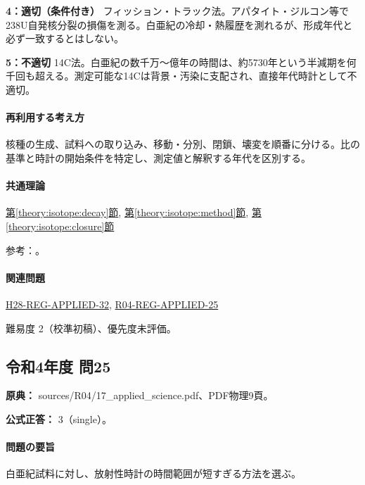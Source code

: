 \noindent\textbf{4：適切（条件付き）} フィッション・トラック法。アパタイト・ジルコン等で238U自発核分裂の損傷を測る。白亜紀の冷却・熱履歴を測れるが、形成年代と必ず一致するとはしない。\par

\noindent\textbf{5：不適切} 14C法。白亜紀の数千万〜億年の時間は、約5730年という半減期を何千回も超える。測定可能な14Cは背景・汚染に支配され、直接年代時計として不適切。\par

\paragraph{再利用する考え方} 核種の生成、試料への取り込み、移動・分別、閉鎖、壊変を順番に分ける。比の基準と時計の開始条件を特定し、測定値と解釈する年代を区別する。

\paragraph{共通理論} \hyperref[theory:isotope:decay]{第\ref*{theory:isotope:decay}節}, \hyperref[theory:isotope:method]{第\ref*{theory:isotope:method}節}, \hyperref[theory:isotope:closure]{第\ref*{theory:isotope:closure}節}

\par 参考：\cite{iso_radiometric,iso_zircon}。

\paragraph{関連問題} \hyperref[q:h28-reg-applied-32]{H28-REG-APPLIED-32}, \hyperref[q:r04-reg-applied-25]{R04-REG-APPLIED-25}

\par 難易度 2（校準初稿）、優先度未評価。

\subsection{令和4年度 問25}
\label{q:r04-reg-applied-25}

\noindent\textbf{原典：} sources/R04/17\_applied\_science.pdf、PDF物理9頁。

\textbf{公式正答：} 3（single）。

\paragraph{問題の要旨} 白亜紀試料に対し、放射性時計の時間範囲が短すぎる方法を選ぶ。


